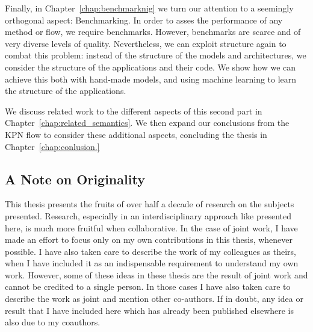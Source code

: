Finally, in Chapter~\ref{chap:benchmarknig} we turn our attention to a seemingly orthogonal aspect: Benchmarking.
In order to asses the performance of any method or flow, we require benchmarks.
However, benchmarks are scarce and of very diverse levels of quality.
Nevertheless, we can exploit structure again to combat this problem: instead of the structure of the models and architectures, we consider the structure of the applications and their code.
We show how we can achieve this both with hand-made models, and using machine learning to learn the structure of the applications.

We discuss related work to the different aspects of this second part in Chapter~\ref{chap:related_semantics}.
We then expand our conclusions from the \ac{KPN} flow to consider these additional aspects, concluding the thesis in Chapter~\ref{chap:conlusion.}

\subsection{A Note on Originality}

This thesis presents the fruits of over half a decade of research on the subjects presented.
Research, especially in an interdisciplinary approach like presented here, is much more fruitful when collaborative.
In the case of joint work, I have made an effort to focus only on my own contributions in this thesis, whenever possible.
I have also taken care to describe the work of my colleagues as theirs, when I have included it as an indispensable requirement to understand my own work.
However,  some of these ideas in these thesis are the result of joint work and cannot be credited to a single person.
In those cases I have also taken care to describe the work as joint and mention other co-authors.
If in doubt, any idea or result that I have included here which has already been published elsewhere is also due to my coauthors.

%


